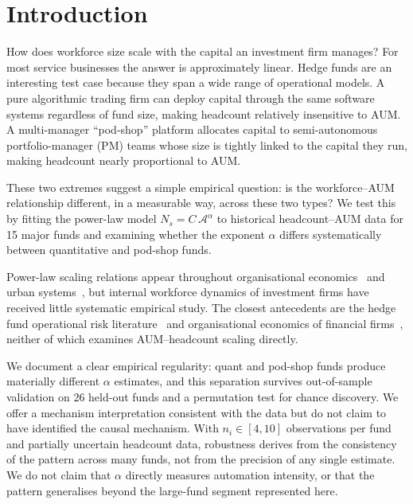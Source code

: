 \documentclass[10pt,onecolumn]{article}
\newcommand{\Ns}{N_{s}}
\newcommand{\Ac}{\mathcal{A}}
\begin{document}
\section{\label{sec:intro}Introduction}

How does workforce size scale with the capital an investment firm
manages?
For most service businesses the answer is approximately linear.
Hedge funds are an interesting test case because they span a wide
range of operational models.
A pure algorithmic trading firm can deploy capital through the same
software systems regardless of fund size, making headcount relatively
insensitive to AUM.
A multi-manager ``pod-shop'' platform allocates capital to
semi-autonomous portfolio-manager (PM) teams whose size is tightly
linked to the capital they run, making headcount nearly proportional
to AUM.

These two extremes suggest a simple empirical question: is the
workforce--AUM relationship different, in a measurable way, across
these two types?
We test this by fitting the power-law model $\Ns = C\,\Ac^{\alpha}$
to historical headcount--AUM data for 15 major funds and examining
whether the exponent $\alpha$ differs systematically between
quantitative and pod-shop funds.

Power-law scaling relations appear throughout organisational
economics~\cite{gabaix2009,axtell2001} and urban
systems~\cite{bettencourt2007}, but internal workforce dynamics
of investment firms have received little systematic empirical
study.
The closest antecedents are the hedge fund operational risk
literature~\cite{brown2012} and organisational economics of
financial firms~\cite{philippon2012}, neither of which examines
AUM--headcount scaling directly.

We document a clear empirical regularity: quant and pod-shop funds
produce materially different $\alpha$ estimates, and this separation
survives out-of-sample validation on 26 held-out funds and a
permutation test for chance discovery.
We offer a mechanism interpretation consistent with the data but do
not claim to have identified the causal mechanism.
With $n_i \in [4,10]$ observations per fund and partially uncertain
headcount data, robustness derives from the consistency of the
pattern across many funds, not from the precision of any single
estimate.
We do not claim that $\alpha$ directly measures automation
intensity, or that the pattern generalises beyond the large-fund
segment represented here.
\end{document}
